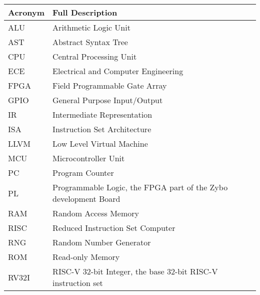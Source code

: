 \begin{table}[H]
	\begin{tabularx}{\textwidth}{| a | x |}
		\hline
		\textbf{Acronym} & \textbf{Full Description}                                       \\
		\hline

		ALU              & Arithmetic Logic Unit                                           \\
		AST              & Abstract Syntax Tree                                            \\
		CPU              & Central Processing Unit                                         \\
		ECE              & Electrical and Computer Engineering                             \\
		FPGA             & Field Programmable Gate Array                                   \\
		GPIO             & General Purpose Input/Output                                    \\
		IR               & Intermediate Representation                                     \\
		ISA              & Instruction Set Architecture                                    \\
		LLVM             & Low Level Virtual Machine                                       \\
		MCU              & Microcontroller Unit                                            \\
		PC               & Program Counter                                                 \\
		PL               & Programmable Logic, the FPGA part of the Zybo development Board \\
		RAM              & Random Access Memory                                            \\
		RISC             & Reduced Instruction Set Computer                                \\
		RNG              & Random Number Generator                                         \\
		ROM              & Read-only Memory                                                \\
		RV32I            & RISC-V 32-bit Integer, the base 32-bit RISC-V instruction set   \\%

		\hline
	\end{tabularx}
\end{table}


